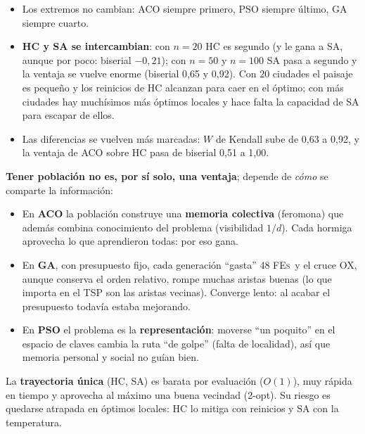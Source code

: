 \documentclass[11pt,a4paper]{article}
\newcommand{\FEs}{\textsc{FEs}}
\begin{document}
\begin{respuesta}
\begin{itemize}
\item Los extremos no cambian: ACO siempre primero, PSO siempre último, GA siempre cuarto.
\item \textbf{HC y SA se intercambian}: con $n=20$ HC es segundo (y le gana a SA, aunque por poco: biserial $-0{,}21$); con $n=50$ y $n=100$ SA pasa a segundo y la ventaja
      se vuelve enorme (biserial 0{,}65 y 0{,}92). Con 20 ciudades el paisaje es pequeño y los reinicios de HC alcanzan para caer en el óptimo; con más ciudades hay muchísimos más óptimos locales
      y hace falta la capacidad de SA para escapar de ellos.
\item Las diferencias se vuelven más marcadas: $W$ de Kendall sube de 0{,}63 a 0{,}92, y la ventaja de ACO sobre HC pasa de biserial 0{,}51 a 1{,}00.
\end{itemize}
\end{respuesta}

\begin{respuesta}
\textbf{Tener población no es, por sí solo, una ventaja}; depende de \emph{cómo} se comparte la información:
\begin{itemize}
\item En \textbf{ACO} la población construye una \textbf{memoria colectiva} (feromona) que además combina conocimiento del problema (visibilidad $1/d$). Cada hormiga aprovecha lo que aprendieron todas:
      por eso gana.
\item En \textbf{GA}, con presupuesto fijo, cada generación ``gasta'' 48 \FEs\ y el cruce OX, aunque conserva el orden relativo, rompe muchas aristas buenas (lo que importa en el TSP son las aristas vecinas).
      Converge lento: al acabar el presupuesto todavía estaba mejorando.
\item En \textbf{PSO} el problema es la \textbf{representación}: moverse ``un poquito'' en el espacio de claves cambia la ruta ``de golpe'' (falta de localidad), así que memoria personal y social no guían bien.
\end{itemize}
La \textbf{trayectoria única} (HC, SA) es barata por evaluación ($O(1)$), muy rápida en tiempo y aprovecha al máximo una buena vecindad (2-opt). Su riesgo es quedarse atrapada en óptimos locales:
HC lo mitiga con reinicios y SA con la temperatura.
\end{respuesta}
\end{document}

